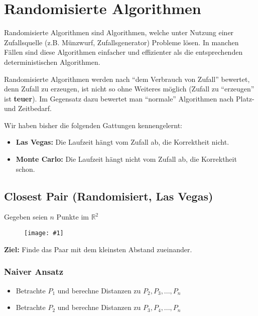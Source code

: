 \documentclass{scrartcl}%
\newcommand{\includepic}[2]{\texttt{[image: \#1]}}
\begin{document}
    \section*{Randomisierte Algorithmen}
    \label{sec:randomisierteAlgorithmen}

    Randomisierte Algorithmen sind Algorithmen,
    welche unter Nutzung einer Zufallsquelle (z.B. Münzwurf, Zufallsgenerator) Probleme lösen.
    In manchen Fällen sind diese Algorithmen einfacher und effizienter
    als die entsprechenden deterministischen Algorithmen.

    Randomisierte Algorithmen werden nach "`dem Verbrauch von Zufall"' bewertet,
    denn Zufall zu erzeugen, ist nicht so ohne Weiteres möglich (Zufall zu "`erzeugen"' ist \textbf{teuer}).
    Im Gegensatz dazu bewertet man "`normale"' Algorithmen nach Platz- und Zeitbedarf.

    Wir haben bisher die folgenden Gattungen kennengelernt:

    \begin{itemize}
        \item \textbf{\textsf{Las Vegas:}} Die Laufzeit hängt vom Zufall ab, die Korrektheit nicht.
        \item \textbf{\textsf{Monte Carlo:}} Die Laufzeit hängt nicht vom Zufall ab, die Korrektheit schon.
    \end{itemize}

    \subsection*{Closest Pair (Randomisiert, Las Vegas)}
    \label{subsec:closestPairrandomisiert,LasVegas}

    Gegeben seien $n$ Punkte im $\mathbb{R}^2$

    \begin{figure}[htb]
        \centering
        \includepic{lec_01_a}{0.25}
        \label{fig:CP_a}
    \end{figure}

    \textbf{\textsf{Ziel:}} Finde das Paar mit dem kleinsten Abstand zueinander.

    \subsubsection*{Naiver Ansatz}
    \label{subsec:naiveransatz}

    \begin{itemize}
        \item Betrachte $P_1$ und berechne Distanzen zu $P_2, P_3, ..., P_n$
        \item Betrachte $P_2$ und berechne Distanzen zu $P_3, P_4, ..., P_n$
    \end{itemize}
\end{document}
